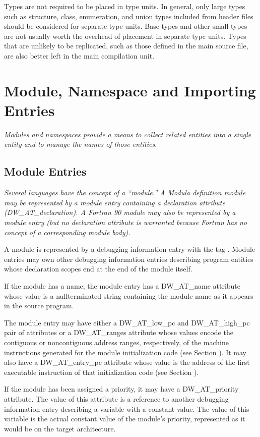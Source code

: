 Types are not required to be placed in type units. In general,
only large types such as structure, class, enumeration, and
union types included from header files should be considered
for separate type units. Base types and other small types
are not usually worth the overhead of placement in separate
type units. Types that are unlikely to be replicated, such
as those defined in the main source file, are also better
left in the main compilation unit.

\section{Module, Namespace and Importing Entries}
\textit{Modules and namespaces provide a means to collect related
entities into a single entity and to manage the names of
those entities.}

\subsection{Module Entries}
\label{chap:moduleentries}
\textit{Several languages have the concept of a ``module.''
A Modula definition module may be represented by a module
entry containing a declaration attribute (DW\_AT\_declaration). A
Fortran 90 module may also be represented by a module entry
(but no declaration attribute is warranted because Fortran
has no concept of a corresponding module body).}

A module is represented by a debugging information entry
with the 
tag .  
Module entries may own other
debugging information entries describing program entities
whose declaration scopes end at the end of the module itself.

If the module has a name, the module entry has a DW\_AT\_name
attribute whose value is a null\dash terminated string containing
the module name as it appears in the source program.

The module entry may have either a DW\_AT\_low\_pc and
DW\_AT\_high\_pc pair of attributes or a DW\_AT\_ranges attribute
whose values encode the contiguous or non\dash contiguous address
ranges, respectively, of the machine instructions generated for
the module initialization code 
(see Section ). 
It may also
have a DW\_AT\_entry\_pc attribute whose value is the address of
the first executable instruction of that initialization code
(see Section ).

If the module has been assigned a priority, it may have a
DW\_AT\_priority attribute. The value of this attribute is a
reference to another debugging information entry describing
a variable with a constant value. The value of this variable
is the actual constant value of the module’s priority,
represented as it would be on the target architecture.

